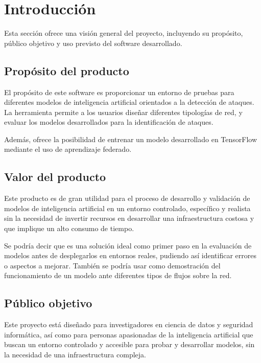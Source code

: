 
\section{Introducción}
\label{sec:RequisitosIntroduccion}
Esta sección ofrece una visión general del proyecto, incluyendo su propósito, público objetivo y uso previsto del software desarrollado.

\subsection{Propósito del producto}
\label{subsec:Proposito}
El propósito de este software es proporcionar un entorno de pruebas para diferentes modelos de inteligencia artificial orientados a la detección de ataques. La herramienta permite a los usuarios diseñar diferentes tipologías de red, y evaluar los modelos desarrollados para la identificación de ataques.

Además, ofrece la posibilidad de entrenar un modelo desarrollado en TensorFlow mediante el uso de aprendizaje federado.

\subsection{Valor del producto}
\label{subsec:Valor}
Este producto es de gran utilidad para el proceso de desarrollo y validación de modelos de inteligencia artificial en un entorno controlado, específico y realista sin la necesidad de invertir recursos en desarrollar una infraestructura costosa y que implique un alto consumo de tiempo.

Se podría decir que es una solución ideal como primer paso en la evaluación de modelos antes de desplegarlos en entornos reales, pudiendo así identificar errores o aspectos a mejorar. También se podría usar como demostración del funcionamiento de un modelo ante diferentes tipos de flujos sobre la red.

\subsection{Público objetivo}
\label{subsec:PublicoObjetivo}
Este proyecto está diseñado para investigadores en ciencia de datos y seguridad informática, así como para personas apasionadas de la inteligencia artificial que buscan un entorno controlado y accesible para probar y desarrollar modelos, sin la necesidad de una infraestructura compleja.

